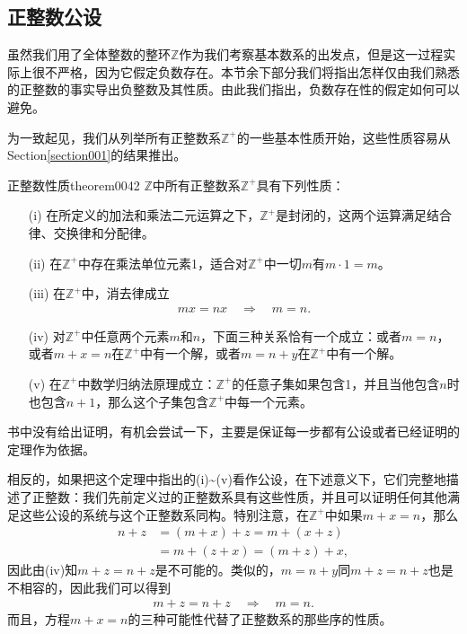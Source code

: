 \subsection{正整数公设}\label{subsection00205}
虽然我们用了全体整数的整环$\mathbb{Z}$作为我们考察基本数系的出发点，但是这一过程实际上很不严格，因为它假定负数存在。本节余下部分我们将指出怎样仅由我们熟悉的正整数的事实导出负整数及其性质。由此我们指出，负数存在性的假定如何可以避免。

为一致起见，我们从列举所有正整数系$\mathbb{Z}^+$的一些基本性质开始，这些性质容易从Section\ref{section001}的结果推出。
\begin{theorem}{正整数性质}{theorem0042}
$\mathbb{Z}$中所有正整数系$\mathbb{Z}^+$具有下列性质：
\begin{enumerate}
\item[(i)] 在所定义的加法和乘法二元运算之下，$\mathbb{Z}^+$是封闭的，这两个运算满足结合律、交换律和分配律。
\item[(ii)] 在$\mathbb{Z}^+$中存在乘法单位元素1，适合对$\mathbb{Z}^+$中一切$m$有$m \cdot 1 = m$。
\item[(iii)] 在$\mathbb{Z}^+$中，消去律成立
\begin{gather}\label{equation0040}
mx=nx\quad\Rightarrow\quad m=n.
\end{gather}
\item[(iv)] 对$\mathbb{Z}^+$中任意两个元素$m$和$n$，下面三种关系恰有一个成立：或者$m=n$，或者$m+x=n$在$\mathbb{Z}^+$中有一个解，或者$m=n+y$在$\mathbb{Z}^+$中有一个解。
\item[(v)] 在$\mathbb{Z}^+$中数学归纳法原理成立：$\mathbb{Z}^+$的任意子集如果包含1，并且当他包含$n$时也包含$n+1$，那么这个子集包含$\mathbb{Z}^+$中每一个元素。
\end{enumerate}
\end{theorem}

书中没有给出证明，有机会尝试一下，主要是保证每一步都有公设或者已经证明的定理作为依据。

相反的，如果把这个定理中指出的(i)\textasciitilde(v)看作公设，在下述意义下，它们完整地描述了正整数：我们先前定义过的正整数系具有这些性质，并且可以证明任何其他满足这些公设的系统与这个正整数系同构。特别注意，在$\mathbb{Z}^+$中如果$m+x=n$，那么
\[
\begin{aligned}
n+z &= (m+x)+z = m+(x+z)\\
&=m+(z+x) = (m+z)+x,
\end{aligned}
\]
因此由(iv)知$m+z=n+z$是不可能的。类似的，$m=n+y$同$m+z=n+z$也是不相容的，因此我们可以得到
\begin{gather}\label{equation0041}
m+z=n+z \quad \Rightarrow\quad m=n.
\end{gather}
而且，方程$m+x=n$的三种可能性代替了正整数系的那些序的性质。


